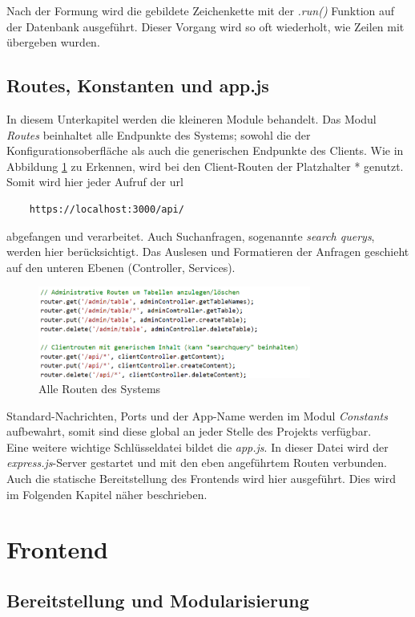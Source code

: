 Nach der Formung wird die gebildete Zeichenkette mit der \textit{.run()} Funktion auf der Datenbank ausgeführt. Dieser Vorgang wird so oft wiederholt, wie Zeilen mit übergeben wurden.

\subsection{Routes, Konstanten und app.js}
In diesem Unterkapitel werden die kleineren Module behandelt. Das Modul \textit{Routes} beinhaltet alle Endpunkte des Systems; sowohl die der Konfigurationsoberfläche als auch die generischen Endpunkte des Clients. Wie in Abbildung \ref{fig:routes} zu Erkennen, wird bei den Client-Routen der Platzhalter * genutzt. Somit wird hier jeder Aufruf der \gls{url}
\begin{verbatim}
    https://localhost:3000/api/
\end{verbatim}
abgefangen und verarbeitet. Auch Suchanfragen, sogenannte \textit{search querys}, werden hier berücksichtigt. Das Auslesen und Formatieren der Anfragen geschieht auf den unteren Ebenen (Controller, Services). 
\begin{figure}[h]
    \centering
    \includegraphics[width=0.8\textwidth]{figures/code-routes.png}
    \caption{Alle Routen des Systems}
    \label{fig:routes}
\end{figure}

Standard-Nachrichten, Ports und der App-Name werden im Modul \textit{Constants} aufbewahrt, somit sind diese global an jeder Stelle des Projekts verfügbar.
\\
Eine weitere wichtige Schlüsseldatei bildet die \textit{app.js}. In dieser Datei wird der \textit{express.js}-Server gestartet und mit den eben angeführtem Routen verbunden. Auch die statische Bereitstellung des Frontends  wird hier ausgeführt. Dies wird im Folgenden Kapitel näher beschrieben.

\section{Frontend} \label{sec:frontend}

\subsection{Bereitstellung und Modularisierung}

